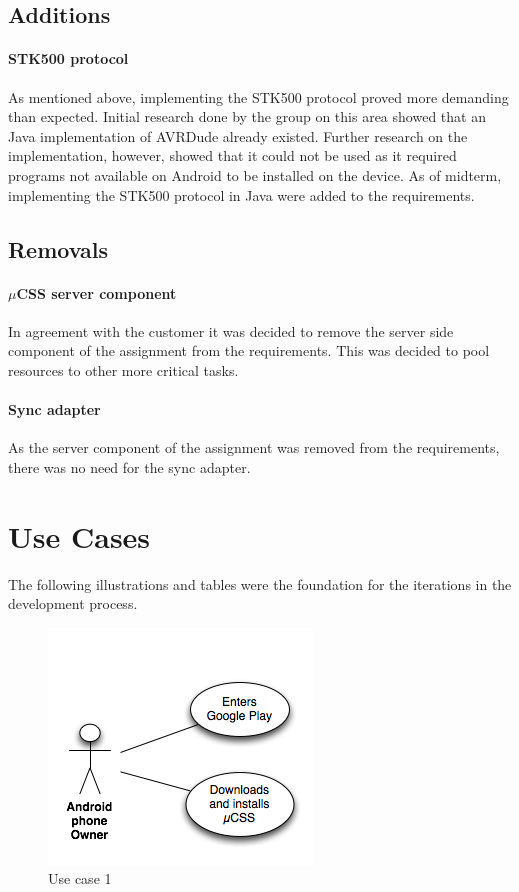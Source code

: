 \subsection{Additions}
\paragraph{STK500 protocol} As mentioned above, implementing the STK500 protocol proved more demanding than expected. Initial research done by the group on this area showed that an Java implementation of AVRDude already existed. Further research on the implementation, however, showed that it could not be used as it required programs not available on Android to be installed on the device. As of midterm, implementing the STK500 protocol in Java were added to the requirements.

\subsection{Removals}
\paragraph{$\mu$CSS server component} In agreement with the customer it was decided to remove the server side component of the assignment from the requirements. This was decided to pool resources to other more critical tasks.

\paragraph{Sync adapter} As the server component of the assignment was removed from the requirements, there was no need for the sync adapter.

\section{Use Cases}
\label{usecases}
The following illustrations and tables were the foundation for the iterations in the development process.

\begin{figure}[H]
\centering
\includegraphics[scale=0.7]{images/UseCase1}
\caption{Use case 1}
\end{figure}

